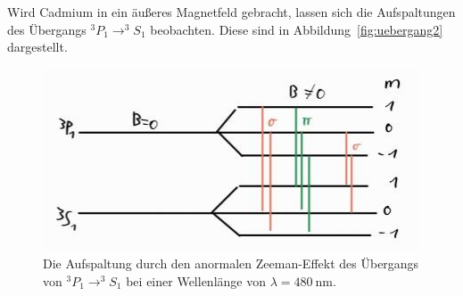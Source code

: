 Wird Cadmium in ein äußeres Magnetfeld gebracht, lassen sich die Aufspaltungen
des Übergangs $^{3}P_{1} \rightarrow ^{3}S_{1}$ beobachten. Diese sind in
Abbildung~\ref{fig:uebergang2} dargestellt.
\begin{figure}[H]
  \centering
  \includegraphics[scale=0.6]{pictures/aufspaltung_blau.png}
  \caption{Die Aufspaltung durch den anormalen Zeeman-Effekt des Übergangs
    von $^{3}P_{1} \rightarrow ^{3}S_{1}$ bei einer Wellenlänge von $\lambda = \SI{480}{\nano\meter}$.}
  \label{fig:uebergang1}
\end{figure}
\noindent
